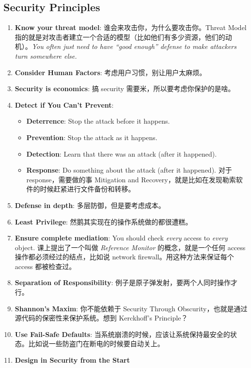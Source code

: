 \documentclass[9pt,landscape]{article}
\begin{document}
\begin{multicols}{2}

\columnseprule=0.25pt

\section{Security Principles}

\begin{enumerate}
    \item \textbf{Know your threat model}: 谁会来攻击你，为什么要攻击你。Threat Model 指的就是对攻击者建立一个合适的模型（比如他们有多少资源，他们的动机）。\emph{You often just need to have ``good enough'' defense to make attackers turn somewhere else.}
    \item \textbf{Consider Human Factors}: 考虑用户习惯，别让用户太麻烦。
    \item \textbf{Security is economics}: 搞 security 需要米，所以要考虑你保护的是啥。
    \item \textbf{Detect if You Can't Prevent}:
        \begin{itemize}
            \item \textbf{Deterrence}: Stop the attack before it happens.
            \item \textbf{Prevention}: Stop the attack as it happens.
            \item \textbf{Detection}: Learn that there was an attack (after it happened).
            \item \textbf{Response}: Do something about the attack (after it happened). 对于 response，需要做的事 Mitigation and Recovery，就是比如在发现勒索软件的时候赶紧进行文件备份和转移。
        \end{itemize}
    \item \textbf{Defense in depth}: 多层防御，但是要考虑成本。
    \item \textbf{Least Privilege}: 然鹅其实现在的操作系统做的都很遭糕。
    \item \textbf{Ensure complete mediation}: You should check \emph{every} access to \emph{every} object. 课上提出了一个叫做 \emph{Reference Monitor} 的概念，就是一个任何 access 操作都必须经过的结点，比如说 network firewall。用这种方法来保证每个 access 都被检查过。
    \item \textbf{Separation of Responsibility}: 例子是原子弹发射，要两个人同时操作才行。
    \item \textbf{Shannon's Maxim}: 你不能依赖于 Security Through Obscurity，也就是通过源代码的保密性来保护系统。想到 Kerckhoff's Principle？
    \item \textbf{Use Fail-Safe Defaults}: 当系统崩溃的时候，应该让系统保持最安全的状态。比如说一些防盗门在断电的时候要自动关上。
    \item \textbf{Design in Security from the Start}
\end{enumerate}


\end{multicols}
\end{document}
